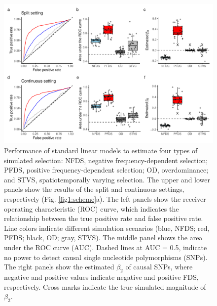 \documentclass[12pt,]{article}
\begin{document}
\begin{figure}[]
  \includegraphics[width=\linewidth]{beta2LMdomi.pdf}
  \caption{Performance of standard linear models to estimate four types of simulated selection: NFDS, negative frequency-dependent selection; PFDS, positive frequency-dependent selection; OD, overdominance; and STVS, spatiotemporally varying selection. The upper and lower panels show the results of the split and continuous settings, respectively (Fig. \ref{fig1:scheme}a). The left panels show the receiver operating characteristic (ROC) curve, which indicates the relationship between the true positive rate and false positive rate. Line colors indicate different simulation scenarios (blue, NFDS; red, PFDS; black, OD; gray, STVS). The middle panel shows the area under the ROC curve (AUC). Dashed lines at AUC = 0.5, indicate no power to detect causal single nucleotide polymorphisms (SNPs). The right panels show the estimated $\beta_2$ of causal SNPs, where negative and positive values indicate negative and positive FDS, respectively. Cross marks indicate the true simulated magnitude of $\beta_2$.}
  \label{figS5:beta2LM}
\end{figure}
\end{document}
